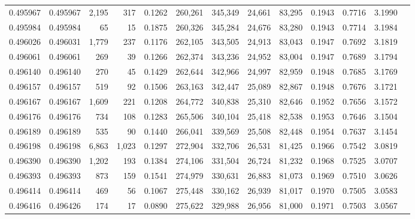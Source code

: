 \begin{tabular}{rrrrrrrrrrrrr}
0.495967 & 0.495967 & 2,195 &   317 &                                     0.1262 & 260,261 & 345,349 &  24,661 &  83,295 & 0.1943 & 0.7716 & 3.1990 \\
0.495984 & 0.495984 &    65 &    15 &                                     0.1875 & 260,326 & 345,284 &  24,676 &  83,280 & 0.1943 & 0.7714 & 3.1984 \\
0.496026 & 0.496031 & 1,779 &   237 &                                     0.1176 & 262,105 & 343,505 &  24,913 &  83,043 & 0.1947 & 0.7692 & 3.1819 \\
0.496061 & 0.496061 &   269 &    39 &                                     0.1266 & 262,374 & 343,236 &  24,952 &  83,004 & 0.1947 & 0.7689 & 3.1794 \\
0.496140 & 0.496140 &   270 &    45 &                                     0.1429 & 262,644 & 342,966 &  24,997 &  82,959 & 0.1948 & 0.7685 & 3.1769 \\
0.496157 & 0.496157 &   519 &    92 &                                     0.1506 & 263,163 & 342,447 &  25,089 &  82,867 & 0.1948 & 0.7676 & 3.1721 \\
0.496167 & 0.496167 & 1,609 &   221 &                                     0.1208 & 264,772 & 340,838 &  25,310 &  82,646 & 0.1952 & 0.7656 & 3.1572 \\
0.496176 & 0.496176 &   734 &   108 &                                     0.1283 & 265,506 & 340,104 &  25,418 &  82,538 & 0.1953 & 0.7646 & 3.1504 \\
0.496189 & 0.496189 &   535 &    90 &                                     0.1440 & 266,041 & 339,569 &  25,508 &  82,448 & 0.1954 & 0.7637 & 3.1454 \\
0.496198 & 0.496198 & 6,863 & 1,023 &                                     0.1297 & 272,904 & 332,706 &  26,531 &  81,425 & 0.1966 & 0.7542 & 3.0819 \\
0.496390 & 0.496390 & 1,202 &   193 &                                     0.1384 & 274,106 & 331,504 &  26,724 &  81,232 & 0.1968 & 0.7525 & 3.0707 \\
0.496393 & 0.496393 &   873 &   159 &                                     0.1541 & 274,979 & 330,631 &  26,883 &  81,073 & 0.1969 & 0.7510 & 3.0626 \\
0.496414 & 0.496414 &   469 &    56 &                                     0.1067 & 275,448 & 330,162 &  26,939 &  81,017 & 0.1970 & 0.7505 & 3.0583 \\
0.496416 & 0.496426 &   174 &    17 &                                     0.0890 & 275,622 & 329,988 &  26,956 &  81,000 & 0.1971 & 0.7503 & 3.0567 \\

\end{tabular}
